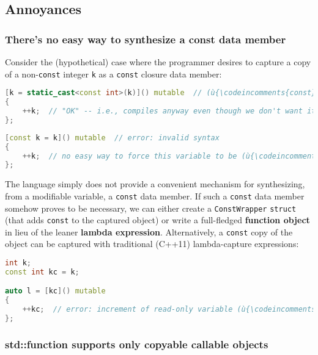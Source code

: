 \subsection[Annoyances]{Annoyances}\label{annoyances-lambdacapture}

\subsubsection[There’s no easy way to synthesize a {\ttfamily const} data member]{There’s no easy way to synthesize a {\SubsubsecCode const} data member}\label{there’s-no-easy-way-to-synthesize-a-const-data-member}

Consider the (hypothetical) case where the programmer desires to capture
a copy of a non-\texttt{const} integer \texttt{k} as a \texttt{const}
closure data member:

\begin{lstlisting}[language=C++]
[k = static_cast<const int>(k)]() mutable  // (ù{\codeincomments{const}}ù) is ignored
{
    ++k;  // "OK" -- i.e., compiles anyway even though we don't want it to
};
\end{lstlisting}


\begin{lstlisting}[language=C++]
[const k = k]() mutable  // error: invalid syntax
{
    ++k;  // no easy way to force this variable to be (ù{\codeincomments{const}}ù)
};
\end{lstlisting}

\noindent The language simply does not provide a convenient mechanism for
synthesizing, from a modifiable variable, a \texttt{const} data member.
If such a \texttt{const} data member somehow proves to be necessary, we
can either create a \texttt{ConstWrapper} \texttt{struct} (that adds
\texttt{const} to the captured object) or write a full-fledged
\textbf{function object} in lieu of the leaner \textbf{lambda
expression}. Alternatively, a \texttt{const} copy of the object can be
captured with traditional (C++11) lambda-capture expressions:

\begin{lstlisting}[language=C++]
int k;
const int kc = k;

auto l = [kc]() mutable
{
    ++kc;  // error: increment of read-only variable (ù{\codeincomments{kc}}ù)
};
\end{lstlisting}


\subsubsection[{\ttfamily std::function} supports only copyable callable objects]{{\SubsubsecCode std::function} supports only copyable callable objects}\label{std::function-supports-only-copyable-callable-objects}

